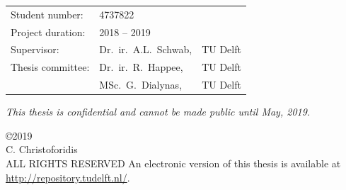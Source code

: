 \begin{titlepage}
\begin{center}
    \vfill
    
    \begin{tabular}{lll}
        Student number: & 4737822 \\
        Project duration: & \multicolumn{2}{l}{ 2018 -- 2019} \\
        Supervisor: & Dr.\ ir.\ A.L.\ Schwab, & TU Delft \\
        Thesis committee:
            & Dr.\ ir.\ R.\ Happee, & TU Delft \\
            & MSc.\ G.\ Dialynas, & TU Delft \\
    \end{tabular}
    
    \bigskip
    \bigskip
    \emph{This thesis is confidential and cannot be made public until May, 2019.}
    
    \bigskip
    \bigskip
    \copyright2019\\
    C. Christoforidis\\
    ALL RIGHTS RESERVED
    An electronic version of this thesis is available at \url{http://repository.tudelft.nl/}.
    
    \end{center}
    
    \end{titlepage}
    
    